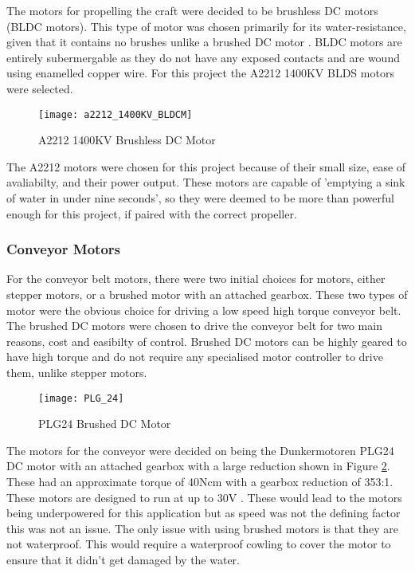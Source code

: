 \documentclass [11pt]{article}
\begin{document}
The motors for propelling the craft were decided to be brushless DC motors (BLDC motors). This type of motor was chosen primarily for its water-resistance, given that it contains no brushes unlike a brushed DC motor \cite{brushed_vs_brushless}. BLDC motors are entirely subermergable as they do not have any exposed contacts and are wound using enamelled copper wire. For this project the A2212 1400KV BLDS motors were selected. 

\begin{figure}[H]
\centerline{\texttt{[image: a2212\_1400KV\_BLDCM]}}
\caption{A2212 1400KV Brushless DC Motor}
\label{fig:a2212_1400KV_BLDCM}
\end{figure}

The A2212 motors were chosen for this project because of their small size, ease of avaliabilty, and their power output. These motors are capable of 'emptying a sink of water in under nine seconds', so they were deemed to be more than powerful enough for this project, if paired with the correct propeller. 

\subsubsection{Conveyor Motors}

For the conveyor belt motors, there were two initial choices for motors, either stepper motors, or a brushed motor with an attached gearbox. These two types of motor were the obvious choice for driving a low speed high torque conveyor belt. The brushed DC motors were chosen to drive the conveyor belt for two main reasons, cost and easibilty of control. Brushed DC motors can be highly geared to have high torque and do not require any specialised motor controller to drive them, unlike stepper motors.

\begin{figure}[H]
\centerline{\texttt{[image: PLG\_24]}}
\caption{PLG24 Brushed DC Motor}
\label{fig:PLG_24}
\end{figure}

The motors for the conveyor were decided on being  the Dunkermotoren PLG24 DC motor with an attached gearbox with a large reduction shown in Figure \ref{fig:PLG_24}. These had an approximate torque of 40Ncm with a gearbox reduction of 353:1. These motors are designed to run at up to 30V \cite{PLG_24}. These would lead to the motors being underpowered for this application but as speed was not the defining factor this was not an issue. The only issue with using brushed motors is that they are not waterproof. This would require a waterproof cowling to cover the motor to ensure that it didn't get damaged by the water. 
\end{document}
